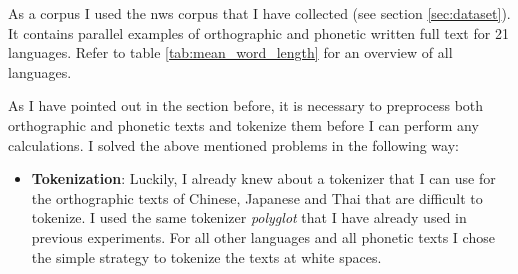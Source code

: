 \begin{description}[style=unboxed]
\item[\textsc{1. step - Corpus}:] As a corpus I used the \ac{nws} corpus that I have collected (see section \ref{sec:dataset}). It contains parallel examples of orthographic and phonetic written full text for 21 languages. Refer to table \ref{tab:mean_word_length} for an overview of all languages.
\item[\textsc{2. step - Preprocessing}:] As I have pointed out in the section before, it is necessary to preprocess both orthographic and phonetic texts and tokenize them before I can perform any calculations. I solved the above mentioned problems in the following way:
\begin{itemize}
    \item \textbf{Tokenization}: Luckily, I already knew about a tokenizer that I can use for the orthographic texts of Chinese, Japanese and Thai that are difficult to tokenize. I used the same tokenizer \textit{polyglot} that I have already used in previous experiments. For all other languages and all phonetic texts I chose the simple strategy to tokenize the texts at white spaces. 


\end{itemize}
\end{description}
